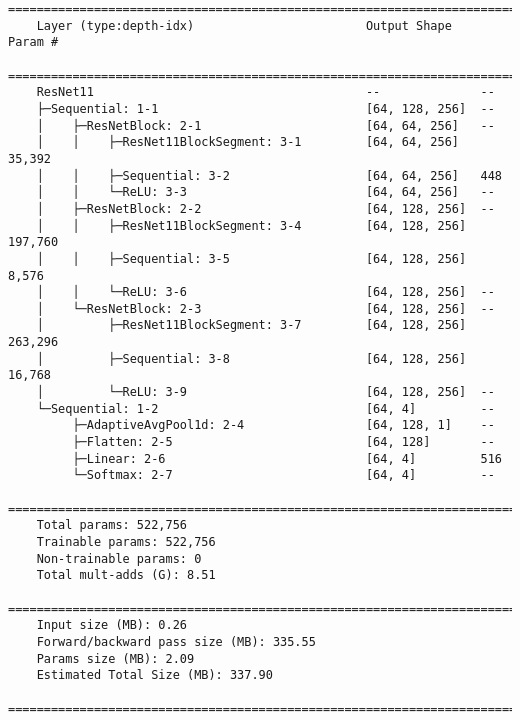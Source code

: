 \newpage
\begin{lstlisting}[caption=\acrfull{resnet11}]
    ===========================================================================
    Layer (type:depth-idx)                        Output Shape    Param #
    ===========================================================================
    ResNet11                                      --              --
    ├─Sequential: 1-1                             [64, 128, 256]  --
    │    ├─ResNetBlock: 2-1                       [64, 64, 256]   --
    │    │    ├─ResNet11BlockSegment: 3-1         [64, 64, 256]   35,392
    │    │    ├─Sequential: 3-2                   [64, 64, 256]   448
    │    │    └─ReLU: 3-3                         [64, 64, 256]   --
    │    ├─ResNetBlock: 2-2                       [64, 128, 256]  --
    │    │    ├─ResNet11BlockSegment: 3-4         [64, 128, 256]  197,760
    │    │    ├─Sequential: 3-5                   [64, 128, 256]  8,576
    │    │    └─ReLU: 3-6                         [64, 128, 256]  --
    │    └─ResNetBlock: 2-3                       [64, 128, 256]  --
    │         ├─ResNet11BlockSegment: 3-7         [64, 128, 256]  263,296
    │         ├─Sequential: 3-8                   [64, 128, 256]  16,768
    │         └─ReLU: 3-9                         [64, 128, 256]  --
    └─Sequential: 1-2                             [64, 4]         --
         ├─AdaptiveAvgPool1d: 2-4                 [64, 128, 1]    --
         ├─Flatten: 2-5                           [64, 128]       --
         ├─Linear: 2-6                            [64, 4]         516
         └─Softmax: 2-7                           [64, 4]         --
    ===========================================================================
    Total params: 522,756
    Trainable params: 522,756
    Non-trainable params: 0
    Total mult-adds (G): 8.51
    ===========================================================================
    Input size (MB): 0.26
    Forward/backward pass size (MB): 335.55
    Params size (MB): 2.09
    Estimated Total Size (MB): 337.90
    ===========================================================================
\end{lstlisting}

